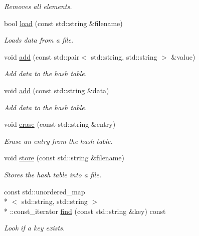 \begin{DoxyCompactItemize}
\begin{DoxyCompactList}\small\item\em Removes all elements. \end{DoxyCompactList}\item 
bool \hyperlink{classttl_1_1_valman_ae7f92b4e9d4b97180c57c7ea34b040c3}{load} (const std\-::string \&filename)
\begin{DoxyCompactList}\small\item\em Loads data from a file. \end{DoxyCompactList}\item 
void \hyperlink{classttl_1_1_valman_a3683caef3a4f4a0a06097d83ab892599}{add} (const std\-::pair$<$ std\-::string, std\-::string $>$ \&value)
\begin{DoxyCompactList}\small\item\em Add data to the hash table. \end{DoxyCompactList}\item 
void \hyperlink{classttl_1_1_valman_a94f8a3ddd50fd4be44997145e06b4ff1}{add} (const std\-::string \&data)
\begin{DoxyCompactList}\small\item\em Add data to the hash table. \end{DoxyCompactList}\item 
void \hyperlink{classttl_1_1_valman_add2a2e1e51491ab9d596927d0adb4267}{erase} (const std\-::string \&entry)
\begin{DoxyCompactList}\small\item\em Erase an entry from the hash table. \end{DoxyCompactList}\item 
void \hyperlink{classttl_1_1_valman_add510b6dc8d492fd223b51f3db9dbc0c}{store} (const std\-::string \&filename)
\begin{DoxyCompactList}\small\item\em Stores the hash table into a file. \end{DoxyCompactList}\item 
const std\-::unordered\-\_\-map\\*
$<$ std\-::string, std\-::string $>$\\*
\-::const\-\_\-iterator \hyperlink{classttl_1_1_valman_ac5c64b2c8cc10a8143831130fe051048}{find} (const std\-::string \&key) const 
\begin{DoxyCompactList}\small\item\em Look if a key exists. \end{DoxyCompactList}\item 

\end{DoxyCompactItemize}
